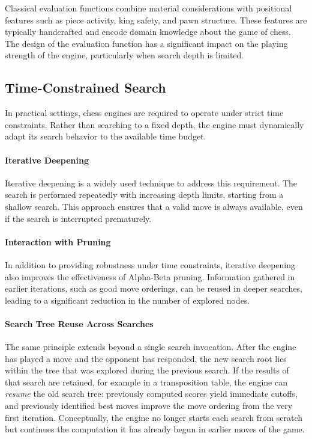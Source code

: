 Classical evaluation functions combine material considerations with positional
features such as piece activity, king safety, and pawn structure. These features
are typically handcrafted and encode domain knowledge about the game of chess.
The design of the evaluation function has a significant impact on the playing
strength of the engine, particularly when search depth is limited.

\subsection{Time-Constrained Search}

In practical settings, chess engines are required to operate under strict time
constraints. Rather than searching to a fixed depth, the engine must dynamically
adapt its search behavior to the available time budget.

\paragraph{Iterative Deepening}
Iterative deepening is a widely used technique to address this requirement. The
search is performed repeatedly with increasing depth limits, starting from a
shallow search. This approach ensures that a valid move is always available, even
if the search is interrupted prematurely.

\paragraph{Interaction with Pruning}
In addition to providing robustness under time constraints, iterative deepening
also improves the effectiveness of Alpha-Beta pruning. Information gathered in
earlier iterations, such as good move orderings, can be reused in deeper searches,
leading to a significant reduction in the number of explored nodes.

\paragraph{Search Tree Reuse Across Searches}
The same principle extends beyond a single search invocation. After the engine
has played a move and the opponent has responded, the new search root lies
within the tree that was explored during the previous search. If the results of
that search are retained, for example in a transposition table, the engine can
\emph{resume} the old search tree: previously computed scores yield immediate
cutoffs, and previously identified best moves improve the move ordering from the
very first iteration. Conceptually, the engine no longer starts each search from
scratch but continues the computation it has already begun in earlier moves of
the game.

